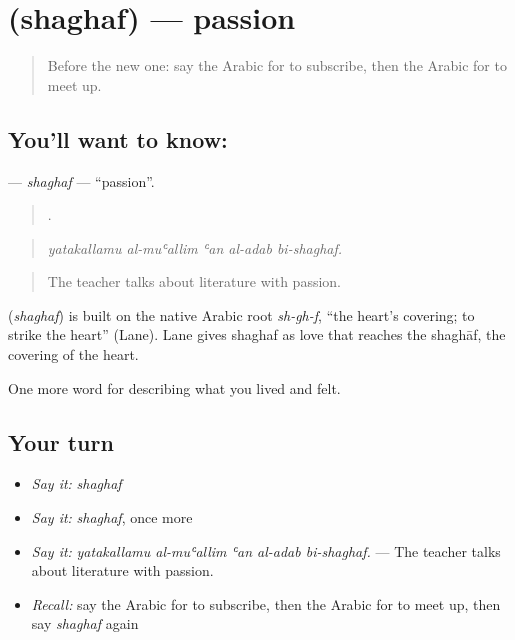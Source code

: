 \section[\texorpdfstring{\ar{شغف} (shaghaf)}{شغف (shaghaf)}]{ (shaghaf) — passion}

\label{lesson:AR-C540-shaghaf}



\begin{quote}
Before the new one: say the Arabic for to subscribe, then the Arabic for to meet up.
\end{quote}

\subsection*{You'll want to know: }
\textbf{} — \emph{shaghaf} — \textquotedblleft{}passion\textquotedblright{}.

\begin{quote}
    .
\end{quote}

\begin{quote}
\emph{yatakallamu al-muʿallim ʿan al-adab bi-shaghaf.}
\end{quote}

\begin{quote}
The teacher talks about literature with passion.
\end{quote}

\begin{cousinweb}
\textbf{} (\emph{shaghaf}) is built on the native Arabic root \emph{sh-gh-f}, \textquotedblleft{}the heart's covering; to strike the heart\textquotedblright{} (Lane). Lane gives shaghaf as love that reaches the shaghāf, the covering of the heart.
\end{cousinweb}

\begin{grammarlens}[title={What you've built}]
One more word for describing what you lived and felt.
\end{grammarlens}

\subsection*{Your turn}
\begin{itemize}
\raggedright
  \item \emph{Say it:} \emph{shaghaf}
  \item \emph{Say it:} \emph{shaghaf}, once more
  \item \emph{Say it:} \emph{yatakallamu al-muʿallim ʿan al-adab bi-shaghaf.} — The teacher talks about literature with passion.
  \item \emph{Recall:} say the Arabic for to subscribe, then the Arabic for to meet up, then say \emph{shaghaf} again
\end{itemize}


